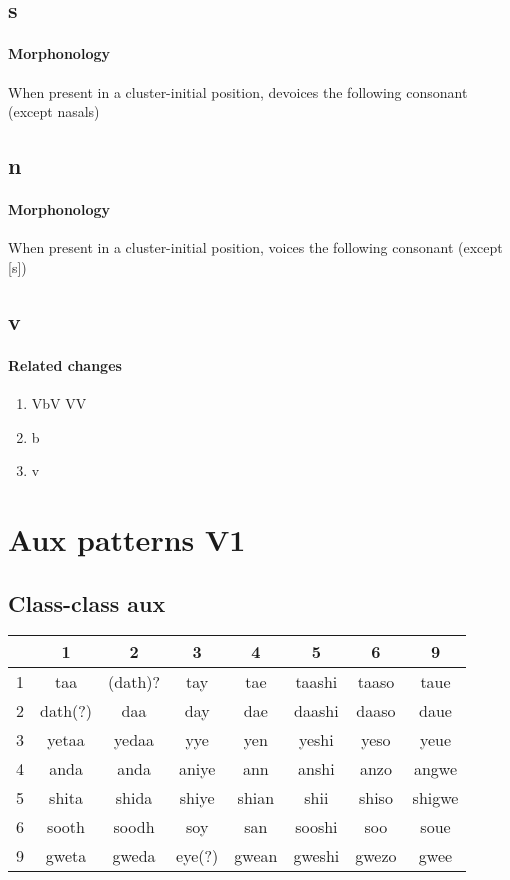 \documentclass[11pt]{book}
\begin{document}
\subsection{s}
\paragraph{Morphonology} When present in a cluster-initial position, devoices the following consonant (except nasals)

\subsection{n}
\paragraph{Morphonology} When present in a cluster-initial position, voices the following consonant (except [s])

\subsection{v}
\paragraph{Related changes}
\begin{enumerate}
\item VbV \textrightarrow VV
\item b \textrightarrow {}
\item {} \textrightarrow v
\end{enumerate}

\section{Aux patterns V1}
\subsection{Class-class aux}

\begin{center}
	\begin{tabular}{|l|c|c|c|c|c|c|c|}
	\hline
	& 1 & 2 & 3 & 4 & 5 & 6 & 9 \\ \hline
	1 & taa & (dath)? & tay & tae & taashi & taaso & taue \\ \hline
	2 & dath(?) & daa & day & dae & daashi & daaso & daue \\ \hline
	3 & yetaa & yedaa & yye & yen & yeshi & yeso & yeue \\ \hline
	4 & anda & anda & aniye & ann & anshi & anzo & angwe \\ \hline
	5 & shita & shida & shiye & shian & shii & shiso & shigwe \\ \hline
    6 & sooth & soodh & soy & san & sooshi & soo & soue \\ \hline
    9 & gweta & gweda & eye(?) & gwean & gweshi & gwezo & gwee \\ \hline
	\end{tabular}
\end{center}
\end{document}
